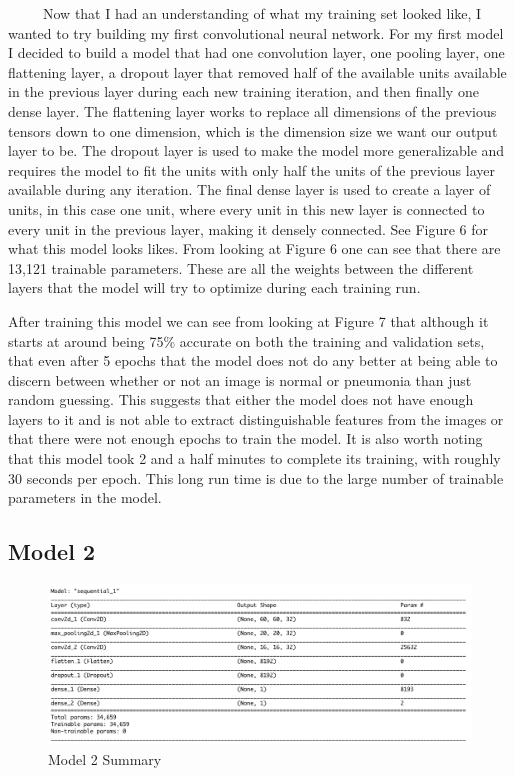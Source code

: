 \documentclass[12pt]{article}
\begin{document}
~~~~~Now that I had an understanding of what my training set looked
like, I wanted to try building my first convolutional neural network.
For my first model I decided to build a model that had one convolution
layer, one pooling layer, one flattening layer, a dropout layer that
removed half of the available units available in the previous layer
during each new training iteration, and then finally one dense layer.
The flattening layer works to replace all dimensions of the previous
tensors down to one dimension, which is the dimension size we want our
output layer to be. The dropout layer is used to make the model more
generalizable and requires the model to fit the units with only half the
units of the previous layer available during any iteration. The final
dense layer is used to create a layer of units, in this case one unit,
where every unit in this new layer is connected to every unit in the
previous layer, making it densely connected. See Figure 6 for what this
model looks likes. From looking at Figure 6 one can see that there are
13,121 trainable parameters. These are all the weights between the
different layers that the model will try to optimize during each
training run.

After training this model we can see from looking at Figure 7 that
although it starts at around being 75\% accurate on both the training
and validation sets, that even after 5 epochs that the model does not do
any better at being able to discern between whether or not an image is
normal or pneumonia than just random guessing. This suggests that either
the model does not have enough layers to it and is not able to extract
distinguishable features from the images or that there were not enough
epochs to train the model. It is also worth noting that this model took
2 and a half minutes to complete its training, with roughly 30 seconds
per epoch. This long run time is due to the large number of trainable
parameters in the model.

\hypertarget{model-2}{%
\subsection{Model 2}\label{model-2}}

\begin{figure}

{\centering \includegraphics[width=0.75\linewidth,height=0.25\textheight]{images/model2} 

}

\caption{Model 2 Summary}\label{fig:sample-fig8}
\end{figure}
\end{document}
